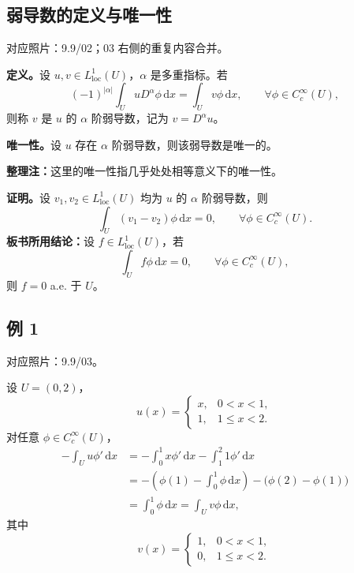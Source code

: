 \documentclass[UTF8,a4paper,11pt,fontset=fandol]{ctexart}
\newcommand{\dd}{\,\mathrm d}
\newcommand{\ednote}[1]{\par{\small\color{notegray}\textbf{整理注：}#1}\par}
\newcommand{\source}[1]{{\small\color{notegray}对应照片：#1。}\par}
\begin{document}
\newpage
\subsection*{弱导数的定义与唯一性}
\source{9.9/02；03 右侧的重复内容合并}
\textbf{定义。}设 $u,v\in L^1_{\mathrm{loc}}(U)$，$\alpha$ 是多重指标。若
\[
(-1)^{|\alpha|}\int_UuD^\alpha\phi\dd x
=\int_Uv\phi\dd x,
\qquad\forall\phi\in C_c^\infty(U),
\]
则称 $v$ 是 $u$ 的 $\alpha$ 阶弱导数，记为 $v=D^\alpha u$。

\textbf{唯一性。}设 $u$ 存在 $\alpha$ 阶弱导数，则该弱导数是唯一的。
\ednote{这里的唯一性指几乎处处相等意义下的唯一性。}

\textbf{证明。}设 $v_1,v_2\in L^1_{\mathrm{loc}}(U)$ 均为 $u$ 的 $\alpha$ 阶弱导数，则
\[
\int_U(v_1-v_2)\phi\dd x=0,
\qquad\forall\phi\in C_c^\infty(U).
\]
\textbf{板书所用结论：}设 $f\in L^1_{\mathrm{loc}}(U)$，若
\[
\int_Uf\phi\dd x=0,\qquad\forall\phi\in C_c^\infty(U),
\]
则 $f=0$ a.e. 于 $U$。

\subsection*{例 1}
\source{9.9/03}
设 $U=(0,2)$，
\[
u(x)=\begin{cases}
x,&0<x<1,\\
1,&1\leq x<2.
\end{cases}
\]
对任意 $\phi\in C_c^\infty(U)$，
\[
\begin{aligned}
-\int_Uu\phi'\dd x
&=-\int_0^1x\phi'\dd x-\int_1^2 1\phi'\dd x\\
&=-\left(\phi(1)-\int_0^1\phi\dd x\right)
  -\bigl(\phi(2)-\phi(1)\bigr)\\
&=\int_0^1\phi\dd x
=\int_Uv\phi\dd x,
\end{aligned}
\]
其中
\[
v(x)=\begin{cases}
1,&0<x<1,\\
0,&1\leq x<2.
\end{cases}
\]

\newpage
\end{document}
